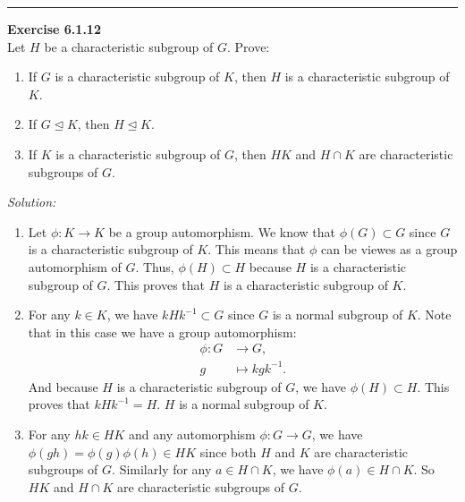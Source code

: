 \documentclass[a4paper, 12pt]{article}
\newenvironment{problem}[2][Exercise]
    { \begin{mdframed}[backgroundcolor=gray!20] \textbf{#1 #2} \\}
    {  \end{mdframed}}
\newenvironment{solution}
    {\textit{Solution:}}
    {}
\begin{document}
\noindent\rule{7in}{2.8pt}
\begin{problem}{6.1.12}
Let \(H\) be a characteristic subgroup of \(G\). Prove:
\begin{enumerate}[(1)]
\item If \(G\) is a characteristic subgroup of \(K\), then \(H\) is a characteristic subgroup of \(K\).
\item If \(G\unlhd K\), then \(H\unlhd K\).
\item If \(K\) is a characteristic subgroup of \(G\), then \(HK\) and \(H\cap K\) are characteristic subgroups of \(G\).
\end{enumerate}
\end{problem}
\begin{solution}
\begin{enumerate}[(1)]
\item Let \(\phi:K\rightarrow K\) be a group automorphism. We know that \(\phi(G)\subset G\) since \(G\) is a characteristic subgroup of \(K\). This means that \(\phi\) can be viewes as a group 
automorphism of \(G\). Thus, \(\phi(H)\subset H\) because \(H\) is a characteristic subgroup of \(G\). This proves that \(H\) is a characteristic subgroup of \(K\). 
\item For any \(k\in K\), we have \(kHk^{-1}\subset G\) since \(G\) is a normal subgroup of \(K\). Note that in this case we have a group automorphism:
\begin{align*}
    \phi:G&\rightarrow G,\\ 
    g&\mapsto kgk^{-1}.
\end{align*}
And because \(H\) is a characteristic subgroup of \(G\), we have \(\phi(H)\subset H\). This proves that \(kHk^{-1}=H\). \(H\) is a normal subgroup of \(K\). 
\item For any \(hk\in HK\) and any automorphism \(\phi:G\rightarrow G\), we have \(\phi(gh)=\phi(g)\phi(h)\in HK\) since both \(H\) and \(K\) are characteristic subgroups of \(G\). Similarly for any \(a\in H\cap K\), we have 
\(\phi(a)\in H\cap K\). So \(HK\) and \(H\cap K\) are characteristic subgroups of \(G\). 
\end{enumerate}
\end{solution}
\end{document}
